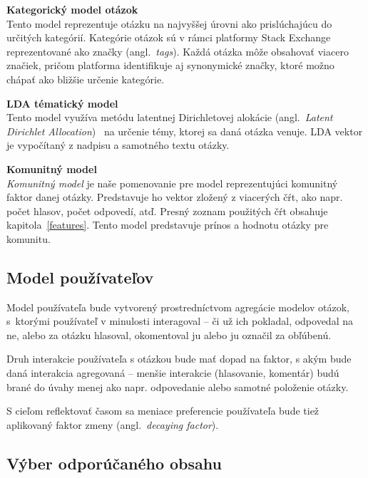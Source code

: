 \begin{my_enumerate}
\item{\textbf{Kategorický model otázok}\\
Tento model reprezentuje otázku na najvyššej úrovni ako prislúchajúcu do určitých kategórií. Kategórie otázok sú v rámci
platformy Stack Exchange reprezentované ako značky (angl.~\emph{tags}). Každá otázka môže obsahovať viacero značiek, pričom
platforma identifikuje aj synonymické značky, ktoré možno chápať ako bližšie určenie kategórie.}

\item{\textbf{LDA tématický model}\\
Tento model využíva metódu latentnej Dirichletovej alokácie (angl.~\emph{Latent Dirichlet Allocation})~\cite{blei2003latent}
na určenie témy, ktorej sa daná otázka venuje. LDA vektor je vypočítaný z nadpisu a samotného textu otázky.}

\item{\textbf{Komunitný model}\\
\textit{Komunitný model} je naše pomenovanie pre model reprezentujúci komunitný faktor danej otázky. Predstavuje ho vektor
zložený z viacerých čŕt, ako napr. počet hlasov, počet odpovedí, atď. Presný zoznam použitých čŕt obsahuje
kapitola~\ref{features}. Tento model predstavuje prínos a hodnotu otázky pre komunitu.}
\end{my_enumerate}


\subsection{Model používateľov}

Model používateľa bude vytvorený prostredníctvom agregácie modelov otázok, s~ktorými používateľ v minulosti interagoval
-- či už ich pokladal, odpovedal na ne, alebo za otázku hlasoval, okomentoval ju alebo ju označil za obľúbenú.

Druh interakcie používateľa s otázkou bude mať dopad na faktor, s akým bude daná interakcia agregovaná -- menšie interakcie
(hlasovanie, komentár) budú brané do úvahy menej ako napr. odpovedanie alebo samotné položenie otázky.

S cieľom reflektovať časom sa meniace preferencie používateľa bude tiež aplikovaný faktor zmeny (angl.~\emph{decaying factor}).


\subsection{Výber odporúčaného obsahu}\label{rec-retrieval}

